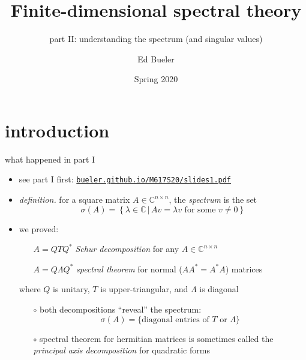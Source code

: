 \documentclass[10pt,hyperref]{beamer}
\title[Finite-dimensional spectral theory II]{Finite-dimensional spectral theory}
\subtitle{part II: understanding the spectrum (and singular values)}
\author{Ed Bueler}
\institute[MATH 617]{MATH 617 Functional Analysis}
\date{Spring 2020}
\newcommand{\CC}{\mathbb{C}}
\begin{document}
\beamertemplatenavigationsymbolsempty


\begin{frame}
  \maketitle
\end{frame}


\section{introduction}

\begin{frame}{what happened in part I}

\begin{itemize}
\item see part I first: \quad \href{http://bueler.github.io/M617S20/slides1.pdf}{\texttt{bueler.github.io/M617S20/slides1.pdf}}
\item \emph{definition.} for a square matrix $A\in\CC^{n\times n}$, the \emph{spectrum} is the set
    $$\sigma(A)=\left\{\lambda\in\CC\,\big|\,Av=\lambda v \text{ for some }v\ne 0\right\}$$
\item we proved:
    \begin{itemize}
    \item[] $A = Q T Q^*$ \quad \emph{Schur decomposition} \quad for any $A \in \CC^{n\times n}$
    \item[] $A = Q \Lambda Q^*$ \quad \emph{spectral theorem} \quad for normal ($AA^*=A^*A$) matrices
    \end{itemize}
where $Q$ is unitary, $T$ is upper-triangular, and $\Lambda$ is diagonal
    \begin{itemize}
    \item[$\circ$] both decompositions ``reveal'' the spectrum:
      $$\sigma(A) = \{\text{diagonal entries of $T$ or $\Lambda$}\}$$
    \item[$\circ$] spectral theorem for hermitian matrices is sometimes called the \emph{principal axis decomposition} for quadratic forms
    \end{itemize}
\end{itemize}
\end{frame}
\end{document}
